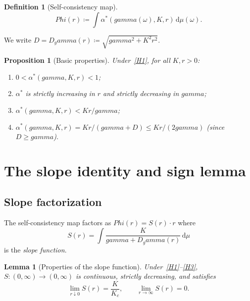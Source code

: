 \documentclass[11pt,a4paper]{article}
\let\Phi\relax\def\Phi{Phi}%
\let\gamma\relax\def\gamma{gamma}%
\newtheorem{lemma}[theorem]{Lemma}
\newtheorem{proposition}[theorem]{Proposition}
\theoremstyle{definition}
\newtheorem{definition}[theorem]{Definition}
\begin{document}
\begin{definition}[Self-consistency map]\label{def:Phi}
\begin{equation}\label{eq:Phi}
\Phi(r) \coloneqq \int \alpha^*(\gamma(\omega), K, r)\,\mathrm{d}\mu(\omega).
\end{equation}
\end{definition}

We write $D = D_\gamma(r) \coloneqq \sqrt{\gamma^2 + K^2 r^2}$.

\begin{proposition}[Basic properties]\label{prop:basic}
Under~\ref{H1}, for all $K, r > 0$:
\begin{enumerate}[label=(\alph*),nosep]
\item $0 < \alpha^*(\gamma, K, r) < 1$;
\item $\alpha^*$ is strictly increasing in $r$ and strictly decreasing in $\gamma$;
\item $\alpha^*(\gamma, K, r) < Kr/\gamma$;
\item $\alpha^*(\gamma, K, r) = Kr/(\gamma + D) \leq Kr/(2\gamma)$ \quad (since $D \geq \gamma$).
\end{enumerate}
\end{proposition}

\section{The slope identity and sign lemma}\label{sec:slope}

\subsection{Slope factorization}

The self-consistency map factors as $\Phi(r) = S(r) \cdot r$ where
\begin{equation}\label{eq:slope}
S(r) = \int \frac{K}{\gamma + D_\gamma(r)}\,\mathrm{d}\mu
\end{equation}
is the \emph{slope function}.

\begin{lemma}[Properties of the slope function]\label{lem:slope-props}
Under~\ref{H1}--\ref{H3}, $S:(0,\infty)\to(0,\infty)$ is continuous, strictly decreasing, and satisfies
\[
\lim_{r\downarrow 0} S(r) = \frac{K}{K_c}, \qquad \lim_{r\to\infty} S(r) = 0.
\]
\end{lemma}
\end{document}
